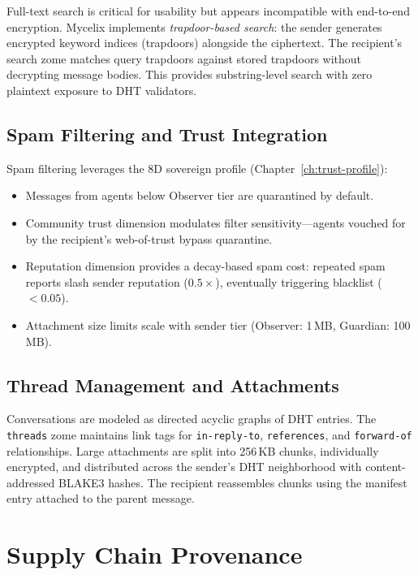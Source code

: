 \documentclass[12pt]{book}
\begin{document}
Full-text search is critical for usability but appears incompatible with
end-to-end encryption.  Mycelix implements \emph{trapdoor-based search}:
the sender generates encrypted keyword indices (trapdoors) alongside the
ciphertext.  The recipient's search zome matches query trapdoors against
stored trapdoors without decrypting message bodies.  This provides
substring-level search with zero plaintext exposure to DHT validators.

\section{Spam Filtering and Trust Integration}
\label{sec:mail-spam}

Spam filtering leverages the 8D sovereign profile (Chapter~\ref{ch:trust-profile}):

\begin{itemize}
  \item Messages from agents below Observer tier are quarantined by default.
  \item Community trust dimension modulates filter sensitivity---agents
    vouched for by the recipient's web-of-trust bypass quarantine.
  \item Reputation dimension provides a decay-based spam cost: repeated
    spam reports slash sender reputation ($0.5\times$), eventually triggering
    blacklist ($< 0.05$).
  \item Attachment size limits scale with sender tier (Observer: 1\,MB,
    Guardian: 100\,MB).
\end{itemize}

\section{Thread Management and Attachments}

Conversations are modeled as directed acyclic graphs of DHT entries.
The \texttt{threads} zome maintains link tags for \texttt{in-reply-to},
\texttt{references}, and \texttt{forward-of} relationships.  Large
attachments are split into 256\,KB chunks, individually encrypted, and
distributed across the sender's DHT neighborhood with content-addressed
BLAKE3 hashes.  The recipient reassembles chunks using the manifest
entry attached to the parent message.


\chapter{Supply Chain Provenance}
\label{ch:supplychain}
\end{document}
